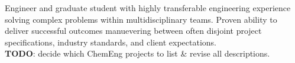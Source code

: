 Engineer and graduate student with highly transferable engineering experience solving complex problems within multidisciplinary teams. Proven ability to deliver successful outcomes manuevering between often disjoint project specifications, industry standards, and client expectations. 
\\ \textbf{TODO}: decide which ChemEng projects to list \& revise all descriptions. 
